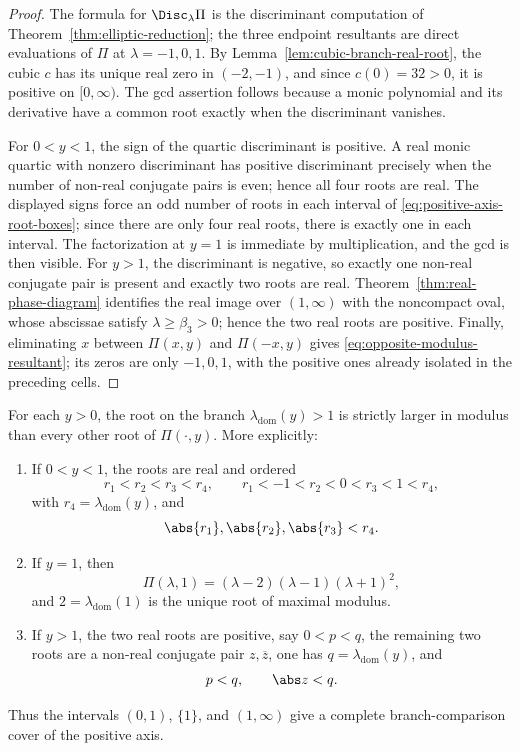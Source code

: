 \begin{proof}
The formula for \(\Disc_\lambda\Pi\) is the discriminant computation of Theorem~\ref{thm:elliptic-reduction}; the three endpoint resultants are direct evaluations of \(\Pi\) at \(\lambda=-1,0,1\).
By Lemma~\ref{lem:cubic-branch-real-root}, the cubic \(c\) has its unique real zero in \((-2,-1)\), and since \(c(0)=32>0\), it is positive on \([0,\infty)\).
The gcd assertion follows because a monic polynomial and its derivative have a common root exactly when the discriminant vanishes.

For \(0<y<1\), the sign of the quartic discriminant is positive.  A real monic quartic with nonzero discriminant has positive discriminant precisely when the number of non-real conjugate pairs is even; hence all four roots are real.  The displayed signs force an odd number of roots in each interval of \eqref{eq:positive-axis-root-boxes}; since there are only four real roots, there is exactly one in each interval.
The factorization at \(y=1\) is immediate by multiplication, and the gcd is then visible.
For \(y>1\), the discriminant is negative, so exactly one non-real conjugate pair is present and exactly two roots are real.  Theorem~\ref{thm:real-phase-diagram} identifies the real image over \((1,\infty)\) with the noncompact oval, whose abscissae satisfy \(\lambda\ge\beta_3>0\); hence the two real roots are positive.
Finally, eliminating \(x\) between \(\Pi(x,y)\) and \(\Pi(-x,y)\) gives \eqref{eq:opposite-modulus-resultant}; its zeros are only \(-1,0,1\), with the positive ones already isolated in the preceding cells.
\end{proof}

\begin{lemma}\label{lem:positive-axis-dominance-certificate}
For each \(y>0\), the root on the branch \(\lambda_{\mathrm{dom}}(y)>1\) is strictly larger in modulus than every other root of \(\Pi(\cdot,y)\).  More explicitly:
\begin{enumerate}
\item If \(0<y<1\), the roots are real and ordered
\[
r_1<r_2<r_3<r_4,
\qquad
r_1<-1<r_2<0<r_3<1<r_4,
\]
with \(r_4=\lambda_{\mathrm{dom}}(y)\), and
\[
\abs{r_1},\abs{r_2},\abs{r_3}<r_4.
\]
\item If \(y=1\), then
\[
\Pi(\lambda,1)=(\lambda-2)(\lambda-1)(\lambda+1)^2,
\]
and \(2=\lambda_{\mathrm{dom}}(1)\) is the unique root of maximal modulus.
\item If \(y>1\), the two real roots are positive, say \(0<p<q\), the remaining two roots are a non-real conjugate pair \(z,\overline z\), one has \(q=\lambda_{\mathrm{dom}}(y)\), and
\[
p<q,
\qquad
\abs z<q.
\]
\end{enumerate}
Thus the intervals \((0,1)\), \(\{1\}\), and \((1,\infty)\) give a complete branch-comparison cover of the positive axis.
\end{lemma}

